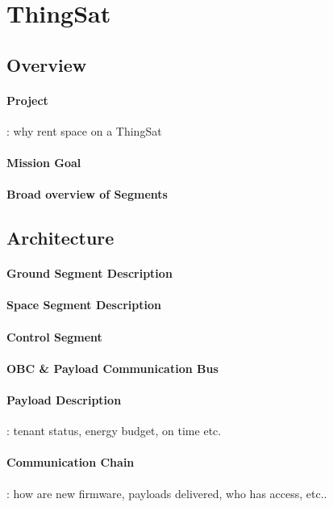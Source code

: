\section{ThingSat}
\label{sec:case-study}

\subsection{Overview}
\paragraph*{Project}: why rent space on a ThingSat
\paragraph*{Mission Goal}
\paragraph*{Broad overview of Segments}

\subsection{Architecture}
\paragraph*{Ground Segment Description}
\paragraph*{Space Segment Description}
\paragraph*{Control Segment} %
\paragraph*{OBC \& Payload Communication Bus}
\paragraph*{Payload Description}: tenant status, energy budget, on time etc.
\paragraph*{Communication Chain}: how are new firmware, payloads delivered,
who has access, etc..

